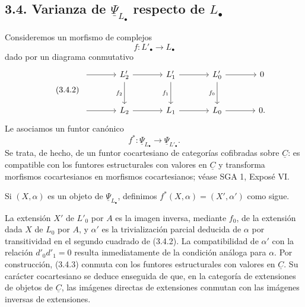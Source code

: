 
\subsection*{3.4. Varianza de $\underline\Psi_{L_\bullet}$ respecto de
$L_\bullet$}

Consideremos un morfismo de complejos
\begin{equation}\tag{3.4.1}
 f:L'_\bullet\longrightarrow L_\bullet
\end{equation}
dado por un diagrama conmutativo
\begin{equation}\tag{3.4.2}
\begin{tikzcd}[column sep=large,row sep=large]
 {}\arrow[r]&L'_2\arrow[r]\arrow[d,"f_2"']
 &L'_1\arrow[r]\arrow[d,"f_1"']
 &L'_0\arrow[r]\arrow[d,"f_0"']&0\\
 {}\arrow[r]&L_2\arrow[r]&L_1\arrow[r]&L_0\arrow[r]&0.
\end{tikzcd}
\end{equation}
Le asociamos un funtor canónico
\begin{equation}\tag{3.4.3}
 f^*:\underline\Psi_{L_\bullet}\longrightarrow
 \underline\Psi_{L'_\bullet}.
\end{equation}
Se trata, de hecho, de un funtor cocartesiano de categorías cofibradas
sobre $\underline C$: es compatible con los funtores estructurales con
valores en $\underline C$ y transforma morfismos cocartesianos en
morfismos cocartesianos; véase SGA 1, Exposé VI.

Si $(X,\alpha)$ es un objeto de $\underline\Psi_{L_\bullet}$,
definimos $f^*(X,\alpha)=(X',\alpha')$ como sigue.


La extensión $X'$ de
$L'_0$ por $A$ es la imagen inversa, mediante $f_0$, de la extensión
dada $X$ de $L_0$ por $A$, y $\alpha'$ es la trivialización parcial
deducida de $\alpha$ por transitividad en el segundo cuadrado de
(3.4.2). La compatibilidad de $\alpha'$ con la relación
$d'_0d'_1=0$ resulta inmediatamente de la condición análoga para
$\alpha$. Por construcción, (3.4.3) conmuta con los funtores
estructurales con valores en $\underline C$. Su carácter cocartesiano
se deduce enseguida de que, en la categoría de extensiones de objetos
de $\underline C$, las imágenes directas de extensiones conmutan con
las imágenes inversas de extensiones.

